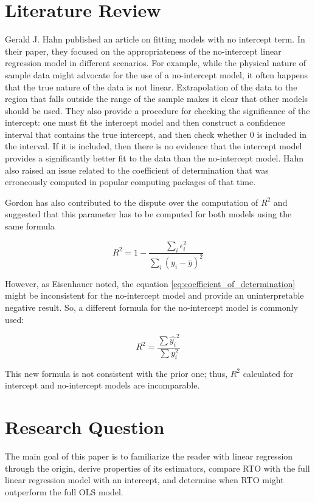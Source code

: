 \documentclass[12pt,a4paper,oneside]{book} %
\begin{document}
	\section{Literature Review}
	Gerald J. Hahn \cite{hahn1977fitting} published an article on fitting models with no intercept term. In their paper, they focused on the appropriateness of the no-intercept linear regression model in different scenarios. For example, while the physical nature of sample data might advocate for the use of a no-intercept model, it often happens that the true nature of the data is not linear. Extrapolation of the data to the region that falls outside the range of the sample makes it clear that other models should be used. They also provide a procedure for checking the significance of the intercept: one must fit the intercept model and then construct a confidence interval that contains the true intercept, and then check whether 0 is included in the interval. If it is included, then there is no evidence that the intercept model provides a significantly better fit to the data than the no-intercept model. Hahn also raised an issue related to the coefficient of determination that was erroneously computed in popular computing packages of that time.
	
	Gordon \cite{gordon1981errors} has also contributed to the dispute over the computation of $R^2$ and suggested that this parameter has to be computed for both models using the same formula
	
	\begin{equation} \label{eq:coefficient_of_determination}
		R^2 = 1 - \frac{\sum_i \epsilon_i ^2}{\sum_i (y_i-\bar{y})^2}
	\end{equation}
	
	However, as Eisenhauer \cite{eisenhauer2003regression} noted, the equation \ref{eq:coefficient_of_determination} might be inconsistent for the no-intercept model and provide an uninterpretable negative result. So, a different formula for the no-intercept model is commonly used:
	
	\begin{equation}
		R^2 = \frac{\sum \hat{y_i}^2}{\sum y_i^2}
	\end{equation}
	
	This new formula is not consistent with the prior one; thus, $R^2$ calculated for intercept and no-intercept models are incomparable.
	
	\section{Research Question}
	The main goal of this paper is to familiarize the reader with linear regression through the origin, derive properties of its estimators, compare RTO with the full linear regression model with an intercept, and determine when RTO might outperform the full OLS model.
	
\end{document}
